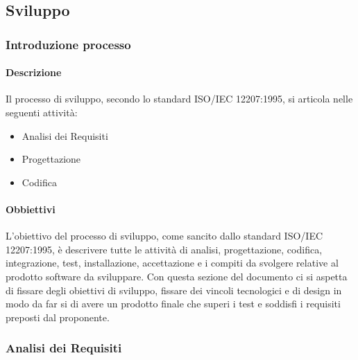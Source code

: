 	\subsection{Sviluppo}
		\subsubsection{Introduzione processo}
			\paragraph{Descrizione}
				Il processo di sviluppo, secondo lo standard ISO/IEC 12207:1995, si articola nelle seguenti attività:\\
				\begin{itemize}
					\item Analisi dei Requisiti
					\item Progettazione
					\item Codifica
				\end{itemize}
			\paragraph{Obbiettivi}
				L'obiettivo del processo di sviluppo, come sancito dallo standard ISO/IEC 12207:1995, è descrivere tutte le attività di analisi, progettazione, codifica, integrazione, test, installazione, accettazione e i compiti da svolgere relative al prodotto software da sviluppare. Con questa sezione del documento ci si aspetta di fissare degli obiettivi di sviluppo, fissare dei vincoli tecnologici e di design in modo da far si di avere un prodotto finale che superi i test e soddisfi i requisiti preposti dal proponente.\\

		\subsubsection{Analisi dei Requisiti}
